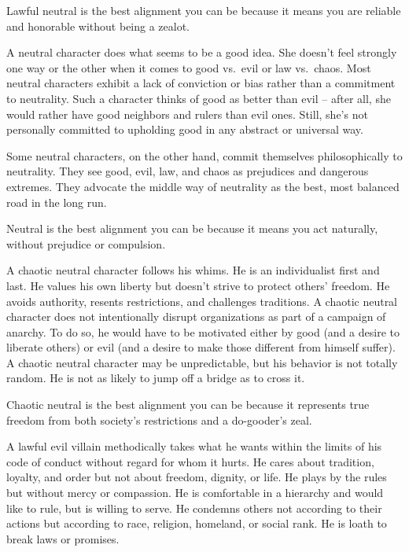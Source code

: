         Lawful neutral is the best alignment you can be because it means you are reliable and honorable without being a zealot.

         A neutral character does what seems to be a good idea. She doesn't feel strongly one way or the other when it comes to good vs.\ evil or law vs.\ chaos. Most neutral characters exhibit a lack of conviction or bias rather than a commitment to neutrality. Such a character thinks of good as better than evil -- after all, she would rather have good neighbors and rulers than evil ones. Still, she's not personally committed to upholding good in any abstract or universal way.

        Some neutral characters, on the other hand, commit themselves philosophically to neutrality. They see good, evil, law, and chaos as prejudices and dangerous extremes. They advocate the middle way of neutrality as the best, most balanced road in the long run.

        Neutral is the best alignment you can be because it means you act naturally, without prejudice or compulsion.

         A chaotic neutral character follows his whims. He is an individualist first and last. He values his own liberty but doesn't strive to protect others' freedom. He avoids authority, resents restrictions, and challenges traditions. A chaotic neutral character does not intentionally disrupt organizations as part of a campaign of anarchy. To do so, he would have to be motivated either by good (and a desire to liberate others) or evil (and a desire to make those different from himself suffer). A chaotic neutral character may be unpredictable, but his behavior is not totally random. He is not as likely to jump off a bridge as to cross it.

        Chaotic neutral is the best alignment you can be because it represents true freedom from both society's restrictions and a do-gooder's zeal.

         A lawful evil villain methodically takes what he wants within the limits of his code of conduct without regard for whom it hurts. He cares about tradition, loyalty, and order but not about freedom, dignity, or life. He plays by the rules but without mercy or compassion. He is comfortable in a hierarchy and would like to rule, but is willing to serve. He condemns others not according to their actions but according to race, religion, homeland, or social rank. He is loath to break laws or promises.

